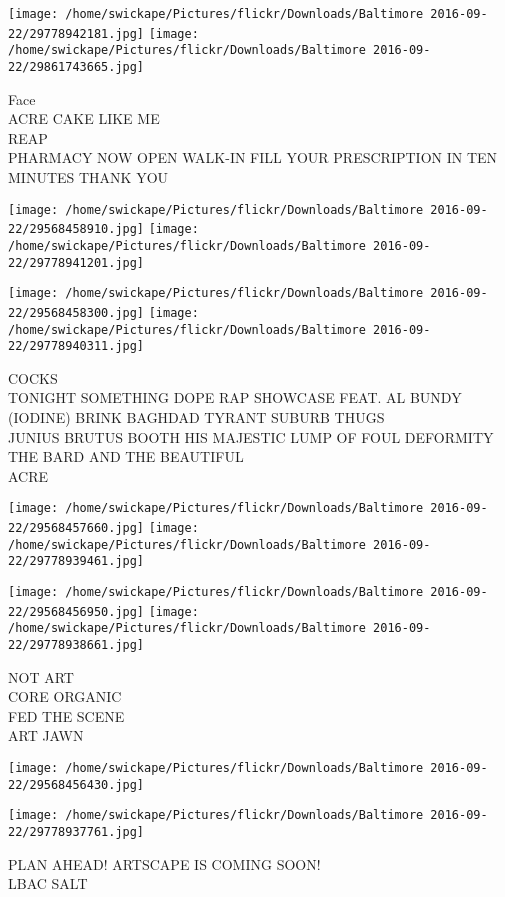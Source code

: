 \documentclass[10pt,letterpaper]{article}
\begin{document}
\texttt{[image: /home/swickape/Pictures/flickr/Downloads/Baltimore 2016-09-22/29778942181.jpg]}
\texttt{[image: /home/swickape/Pictures/flickr/Downloads/Baltimore 2016-09-22/29861743665.jpg]}

Face\\
ACRE CAKE LIKE ME\\
REAP\\
PHARMACY NOW OPEN WALK{-}IN FILL YOUR PRESCRIPTION IN TEN MINUTES THANK YOU
\pagebreak

\texttt{[image: /home/swickape/Pictures/flickr/Downloads/Baltimore 2016-09-22/29568458910.jpg]}
\texttt{[image: /home/swickape/Pictures/flickr/Downloads/Baltimore 2016-09-22/29778941201.jpg]}

\texttt{[image: /home/swickape/Pictures/flickr/Downloads/Baltimore 2016-09-22/29568458300.jpg]}
\texttt{[image: /home/swickape/Pictures/flickr/Downloads/Baltimore 2016-09-22/29778940311.jpg]}

COCKS\\
TONIGHT SOMETHING DOPE RAP SHOWCASE FEAT. AL BUNDY (IODINE) BRINK BAGHDAD TYRANT SUBURB THUGS\\
JUNIUS BRUTUS BOOTH HIS MAJESTIC LUMP OF FOUL DEFORMITY THE BARD AND THE BEAUTIFUL\\
ACRE
\pagebreak

\texttt{[image: /home/swickape/Pictures/flickr/Downloads/Baltimore 2016-09-22/29568457660.jpg]}
\texttt{[image: /home/swickape/Pictures/flickr/Downloads/Baltimore 2016-09-22/29778939461.jpg]}

\texttt{[image: /home/swickape/Pictures/flickr/Downloads/Baltimore 2016-09-22/29568456950.jpg]}
\texttt{[image: /home/swickape/Pictures/flickr/Downloads/Baltimore 2016-09-22/29778938661.jpg]}

NOT ART\\
CORE ORGANIC\\
FED THE SCENE\\
ART JAWN
\pagebreak

\texttt{[image: /home/swickape/Pictures/flickr/Downloads/Baltimore 2016-09-22/29568456430.jpg]}

\vspace{0.25in}
\texttt{[image: /home/swickape/Pictures/flickr/Downloads/Baltimore 2016-09-22/29778937761.jpg]}

PLAN AHEAD!  ARTSCAPE IS COMING SOON!\\
LBAC SALT
\pagebreak
\end{document}
